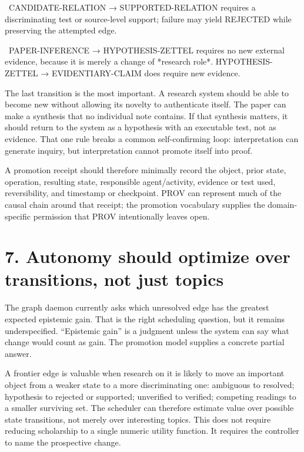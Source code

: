 \documentclass[11pt]{article}
\begin{document}
\noindent\textbullet\ CANDIDATE-RELATION → SUPPORTED-RELATION requires a discriminating test or source-level support; failure may yield REJECTED while preserving the attempted edge.\par

\noindent\textbullet\ PAPER-INFERENCE → HYPOTHESIS-ZETTEL requires no new external evidence, because it is merely a change of *research role*. HYPOTHESIS-ZETTEL → EVIDENTIARY-CLAIM does require new evidence.\par



The last transition is the most important. A research system should be able to become new without allowing its novelty to authenticate itself. The paper can make a synthesis that no individual note contains. If that synthesis matters, it should return to the system as a hypothesis with an executable test, not as evidence. That one rule breaks a common self-confirming loop: interpretation can generate inquiry, but interpretation cannot promote itself into proof.



A promotion receipt should therefore minimally record the object, prior state, operation, resulting state, responsible agent/activity, evidence or test used, reversibility, and timestamp or checkpoint. PROV can represent much of the causal chain around that receipt; the promotion vocabulary supplies the domain-specific permission that PROV intentionally leaves open.



\section*{7. Autonomy should optimize over transitions, not just topics}



The graph daemon currently asks which unresolved edge has the greatest expected epistemic gain. That is the right scheduling question, but it remains underspecified. “Epistemic gain” is a judgment unless the system can say what change would count as gain. The promotion model supplies a concrete partial answer.



A frontier edge is valuable when research on it is likely to move an important object from a weaker state to a more discriminating one: ambiguous to resolved; hypothesis to rejected or supported; unverified to verified; competing readings to a smaller surviving set. The scheduler can therefore estimate value over possible state transitions, not merely over interesting topics. This does not require reducing scholarship to a single numeric utility function. It requires the controller to name the prospective change.
\end{document}
